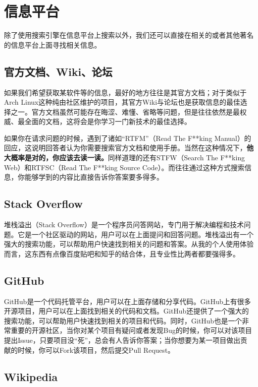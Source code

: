 \section{信息平台}

除了使用搜索引擎在信息平台上搜索以外，我们还可以直接在相关的或者其他著名的信息平台上面寻找相关信息。

\subsection{官方文档、Wiki、论坛}

如果我们希望获取某软件等的信息，最好的地方往往是其官方文档；对于类似于Arch Linux这种纯由社区维护的项目，其官方Wiki与论坛也是获取信息的最佳选择之一。官方文档虽然可能存在晦涩、难懂、省略等问题，但是往往依然是最权威、最全面的文档，这将会是你学习一门新技术的最佳选择。

如果你在请求问题的时候，遇到了诸如“RTFM”（Read The F**king Manual）的回应，这说明回答者认为你需要搜索官方文档和使用手册。当然在这种情况下，\textbf{他大概率是对的，你应该去读一读。}同样道理的还有STFW（Search The F**king Web）和RTFSC（Read The F**king Source Code）。而往往通过这种方式搜索信息，你能够学到的内容比直接告诉你答案要多得多。

\subsection{Stack Overflow}

堆栈溢出（Stack Overflow）是一个程序员问答网站，专门用于解决编程和技术问题。它是一个社区驱动的网站，用户可以在上面提问和回答问题。堆栈溢出有一个强大的搜索功能，可以帮助用户快速找到相关的问题和答案。从我的个人使用体验而言，这东西有点像百度贴吧和知乎的结合体，且专业性比两者都要强得多。

\subsection{GitHub}

GitHub是一个代码托管平台，用户可以在上面存储和分享代码。GitHub上有很多开源项目，用户可以在上面找到相关的代码和文档。GitHub还提供了一个强大的搜索功能，可以帮助用户快速找到相关的项目和代码。同时，GitHub也是一个非常重要的开源社区，当你对某个项目有疑问或者发现Bug的时候，你可以对该项目提出Issue，只要项目没“死”，总会有人告诉你答案；当你想要为某一项目做出贡献的时候，你可以Fork该项目，然后提交Pull Request。

\subsection{Wikipedia}

